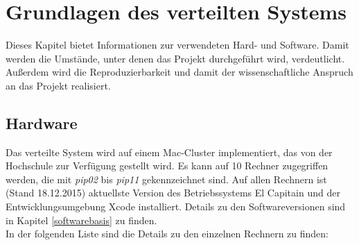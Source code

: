 \chapter{Grundlagen des verteilten Systems}
\label{Grundlagen}
Dieses Kapitel bietet Informationen zur verwendeten Hard- und Software. Damit werden die Umstände, unter denen das Projekt durchgeführt wird, verdeutlicht. Außerdem wird die Reproduzierbarkeit und damit der wissenschaftliche Anspruch an das Projekt realisiert. 

\section{Hardware}
Das verteilte System wird auf einem Mac-Cluster implementiert, das von der Hochschule zur Verfügung gestellt wird. Es kann auf 10 Rechner zugegriffen werden, die mit \emph{pip02} bis \emph{pip11} gekennzeichnet sind. Auf allen Rechnern ist (Stand 18.12.2015) aktuellste Version des Betriebssystems El Capitain und der Entwicklungsumgebung Xcode installiert. Details zu den Softwareversionen sind in Kapitel \ref{softwarebasis} zu finden. \\
In der folgenden Liste sind die Details zu den einzelnen Rechnern zu finden:

